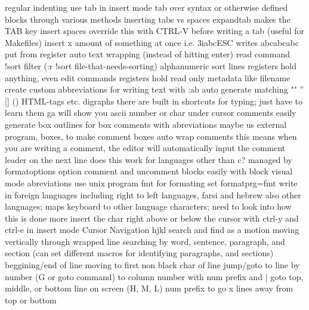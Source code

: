 \documentclass[12pt]{book}
\begin{document}
    regular indenting
      use tab in insert mode
      tab over syntax or otherwise defined blocks through various methods
  inserting tabs vs spaces
    expandtab makes the TAB key insert spaces
    override this with CTRL-V before writing a tab (useful for Makefiles)
  insert x amount of something at once i.e. 3iabcESC writes abcabcabc
  put from register
  auto text wrapping (instead of hitting enter)
  read command
    !sort filter (:r !sort file-that-needs-sorting)
  alphanumeric sort lines
  registers hold anything, even edit commands
  registers hold read only metadata like filename
  create custom abbreviations for writing text with :ab
  auto generate matching "" '' [] {} () HTML-tags etc.
  digraphs
    there are built in shortcuts for typing; just have to learn them
  ga will show you ascii number or char under cursor
  comments
    easily generate box outlines for box comments with abreviations
    maybe us external program, boxes, to make comment boxes
    auto wrap comments
      this means when you are writing a comment, the editor will automatically input the comment leader on the next line
      does this work for languages other than c?
      managed by formatoptions option
    comment and uncomment blocks easily with block visual mode
  abreviations
  use unix program fmt for formating
    set formatprg=fmt
  write in foreign languages including right to left languages, farsi and hebrew
    also other languages; maps keyboard to other language characters; need to look into how this is done more
  insert the char right above or below the cursor with ctrl-y and ctrl-e in insert mode
Cursor Navigation
  hjkl
  search and find as a motion
  moving vertically through wrapped line
  searching
  by word, sentence, paragraph, and section (can set different macros for identifying paragraphs, and sections)
  beggining/end of line
  moving to first non black char of line
  jump/goto
    to line by number (G or goto command)
    to column number with num prefix and |
    goto top, middle, or bottom line on screen (H, M, L) num prefix to go x lines away from top or bottom
\end{document}
